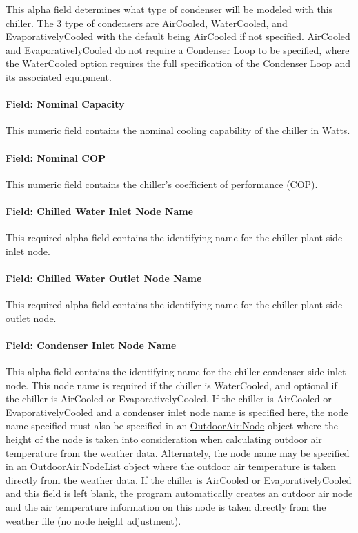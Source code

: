 This alpha field determines what type of condenser will be modeled with this chiller. The 3 type of condensers are AirCooled, WaterCooled, and EvaporativelyCooled with the default being AirCooled if not specified. AirCooled and EvaporativelyCooled do not require a Condenser Loop to be specified, where the WaterCooled option requires the full specification of the Condenser Loop and its associated equipment.

\paragraph{Field: Nominal Capacity}\label{field-nominal-capacity-4}

This numeric field contains the nominal cooling capability of the chiller in Watts.

\paragraph{Field: Nominal COP}\label{field-nominal-cop-2}

This numeric field contains the chiller's coefficient of performance (COP).

\paragraph{Field: Chilled Water Inlet Node Name}\label{field-chilled-water-inlet-node-name-5}

This required alpha field contains the identifying name for the chiller plant side inlet node.

\paragraph{Field: Chilled Water Outlet Node Name}\label{field-chilled-water-outlet-node-name-5}

This required alpha field contains the identifying name for the chiller plant side outlet node.

\paragraph{Field: Condenser Inlet Node Name}\label{field-condenser-inlet-node-name-5}

This alpha field contains the identifying name for the chiller condenser side inlet node. This node name is required if the chiller is WaterCooled, and optional if the chiller is AirCooled or EvaporativelyCooled. If the chiller is AirCooled or EvaporativelyCooled and a condenser inlet node name is specified here, the node name specified must also be specified in an \hyperref[outdoorairnode]{OutdoorAir:Node} object where the height of the node is taken into consideration when calculating outdoor air temperature from the weather data. Alternately, the node name may be specified in an \hyperref[outdoorairnodelist]{OutdoorAir:NodeList} object where the outdoor air temperature is taken directly from the weather data. If the chiller is AirCooled or EvaporativelyCooled and this field is left blank, the program automatically creates an outdoor air node and the air temperature information on this node is taken directly from the weather file (no node height adjustment).

